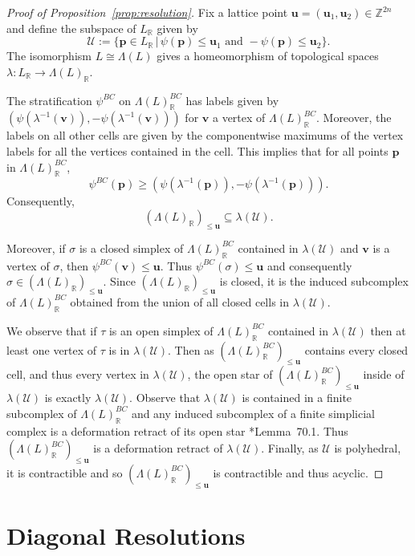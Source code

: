 \documentclass{amsart}
\newcommand{\ZZ}{\mathbb{Z}}
\newcommand{\RR}{\mathbb{R}}
\theoremstyle{remark}
\begin{document}
\begin{proof}[Proof of Proposition~\ref{prop:resolution}]
  Fix a lattice point $\bm{u}=(\bm{u}_1,\bm{u}_2)\in \ZZ^{2n}$ and define the subspace of $L_{\RR}$ given by
  \[\mathcal{U} := \{\bm{p} \in L_{\RR} \,|\, \psi(\bm{p})\leq \bm{u}_1\text{ and }-\psi(\bm{p})\leq \bm{u}_2\}.\]
  The isomorphism $L\cong \Lambda(L)$ gives a homeomorphism of topological spaces $\lambda:L_{\RR}\rightarrow \Lambda(L)_{\RR}$.

  The stratification $\psi^{BC}$ on $\Lambda(L)_{\RR}^{BC}$ has labels given by $(\psi(\lambda^{-1}(\bm{v})),-\psi(\lambda^{-1}(\bm{v})))$ for $\bm{v}$ a vertex of $\Lambda(L)_{\RR}^{BC}$. Moreover, the labels on all other cells are given by the componentwise maximums of the vertex labels for all the vertices contained in the cell. This implies that for all points $\bm{p}$ in $\Lambda(L)_{\RR}^{BC}$,\[\psi^{BC}(\bm{p})\geq (\psi(\lambda^{-1}(\bm{p})),-\psi(\lambda^{-1}(\bm{p}))).\] Consequently, \[(\Lambda(L)_{\RR})_{\leq \bm{u}}\subseteq \lambda(\mathcal{U}).\]

  Moreover, if $\sigma$ is a closed simplex of $\Lambda(L)_{\RR}^{BC}$ contained in $\lambda(\mathcal{U})$ and $\bm{v}$ is a vertex of $\sigma$, then $\psi^{BC}(\bm{v})\leq \bm{u}$.
  Thus $\psi^{BC}(\sigma)\leq \bm{u}$ and consequently $\sigma\in (\Lambda(L)_{\RR})_{\leq \bm{u}}$.
  Since $(\Lambda(L)_{\RR})_{\leq \bm{u}}$ is closed, it is the induced subcomplex of $\Lambda(L)_{\RR}^{BC}$ obtained from the union of all closed cells in $\lambda(\mathcal{U})$.

  We observe that if $\tau$ is an open simplex of $\Lambda(L)_{\RR}^{BC}$ contained in $\lambda(\mathcal{U})$ then at least one vertex of $\tau$ is in $\lambda(\mathcal{U})$. Then as $(\Lambda(L)_{\RR}^{BC})_{\leq \bm{u}}$ contains every closed cell, and thus every vertex in $\lambda(\mathcal{U})$, the open star of $(\Lambda(L)_{\RR}^{BC})_{\leq \bm{u}}$ inside of $\lambda(\mathcal{U})$ is exactly $\lambda(\mathcal{U})$. Observe that $\lambda(\mathcal{U})$ is contained in a finite subcomplex of $\Lambda(L)_{\RR}^{BC}$ and any induced subcomplex of a finite simplicial complex is a deformation retract of its open star \cite{Munkres}*{Lemma~70.1}. Thus $(\Lambda(L)_{\RR}^{BC})_{\leq \bm{u}}$ is a deformation retract of $\lambda(\mathcal{U})$. Finally, as $\mathcal{U}$ is polyhedral, it is contractible and so $(\Lambda(L)_{\RR}^{BC})_{\leq \bm{u}}$ is contractible and thus acyclic.
\end{proof}

\section{Diagonal Resolutions}
\label{sec:diagonal}
\end{document}

